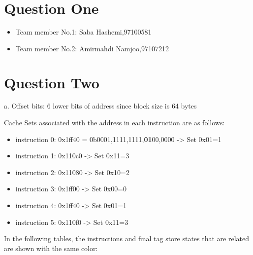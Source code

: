 \documentclass[12pt]{article}
\begin{document}
\section{Question One}

\begin{itemize}
	
	\item Team member No.1: Saba Hashemi,97100581
	\item Team member No.2: Amirmahdi Namjoo,97107212
\end{itemize}


\newpage

\section{Question Two}


a. Offset bits: 6 lower bits of address since block size is 64 bytes

Cache Sets associated with the address in each instruction are as follows:

\begin{itemize}
\item instruction 0: 0x1ff40 = 0b0001,1111,1111,\textbf{01}00,0000 -> Set 0x01=1

\item instruction 1: 0x110c0 -> Set 0x11=3

\item instruction 2: 0x11080 -> Set 0x10=2

\item instruction 3: 0x1ff00 -> Set 0x00=0

\item instruction 4: 0x1ff40 -> Set 0x01=1

\item instruction 5: 0x110f0 -> Set 0x11=3

\end{itemize}

In the following tables, the instructions and final tag store states that are related are shown with the same color: 
\end{document}
